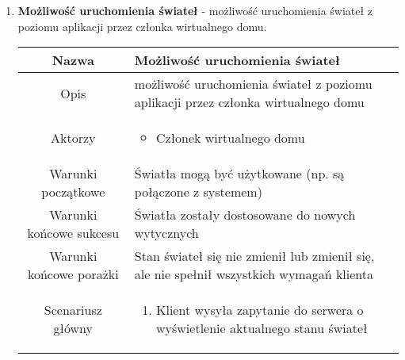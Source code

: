 \documentclass{article}
\begin{document}
\begin{enumerate}
\begin{enumerate}
			\item \textbf{Możliwość uruchomienia świateł} - możliwość uruchomienia
				świateł z poziomu aplikacji przez członka wirtualnego domu.
				\begin{table}[H]
					\centering
					\begin{tabular}{|c|p{7cm}|}
						\hline
						Nazwa                   & \textbf{Możliwość uruchomienia świateł}                                                                                                                                                                                                                             \\
						\hline
						Opis                    & możliwość uruchomienia świateł z poziomu aplikacji przez członka wirtualnego domu                                                                                                                                                                                   \\
						\hline
						Aktorzy                 & \begin{itemize}\item Członek wirtualnego domu\end{itemize}                                                                                                                                                                                                          \\
						\hline
						Warunki początkowe      & Światła mogą być użytkowane (np. są połączone z systemem)                                                                                                                                                                                                           \\
						\hline
						Warunki końcowe sukcesu & Światła zostały dostosowane do nowych wytycznych                                                                                                                                                                                                                    \\
						\hline
						Warunki końcowe porażki & Stan świateł się nie zmienił lub zmienił się, ale nie spełnił wszystkich wymagań klienta                                                                                                                                                                            \\
						\hline
						Scenariusz główny       & \begin{enumerate}\item Klient wysyła zapytanie do serwera o wyświetlenie aktualnego stanu świateł


\end{enumerate}
\end{tabular}
\end{table}
\end{enumerate}
\end{enumerate}
\end{document}

